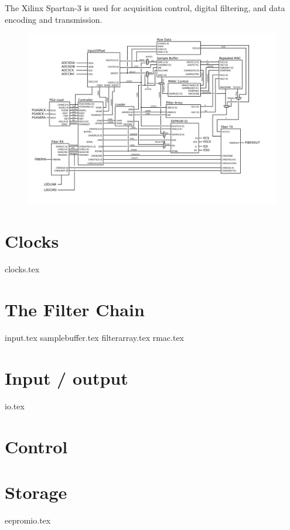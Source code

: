 The Xilinx Spartan-3 is used for acquisition control, digital
filtering, and data encoding and transmission.

\begin{figure}[h!]
\includegraphics[scale=0.7]{FPGA.svg}
\end{figure}

\section{Clocks}
{clocks.tex}

\section{The Filter Chain}
{input.tex}
{samplebuffer.tex}
{filterarray.tex}
{rmac.tex}

\section{Input / output}

{io.tex}

\section{Control}


\section{Storage}
{eepromio.tex}

